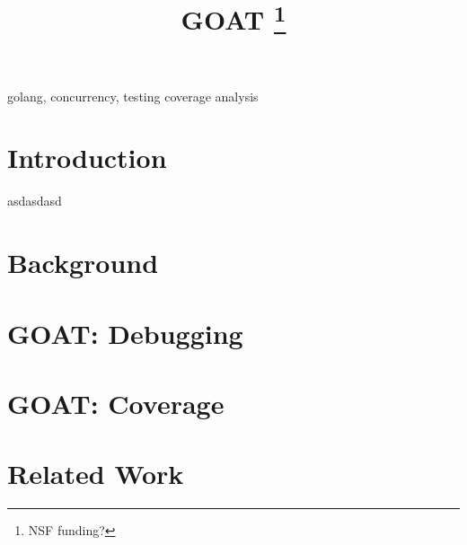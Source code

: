 \documentclass[conference]{IEEEtran}
\begin{document}
\title{GOAT
\thanks{NSF funding?}
}

\author{
\and
{}
}

\maketitle

\begin{abstract}

\end{abstract}

\begin{IEEEkeywords}
golang, concurrency, testing coverage analysis
\end{IEEEkeywords}

\section{Introduction}
\label{sec:intro}


asdasdasd


\section{Background}
\label{sec:bg}


\section{GOAT: Debugging}
\label{sec:design}



\section{GOAT: Coverage}
\label{sec:coverage}


\section{Related Work}
\label{sec:related}







\end{document}
